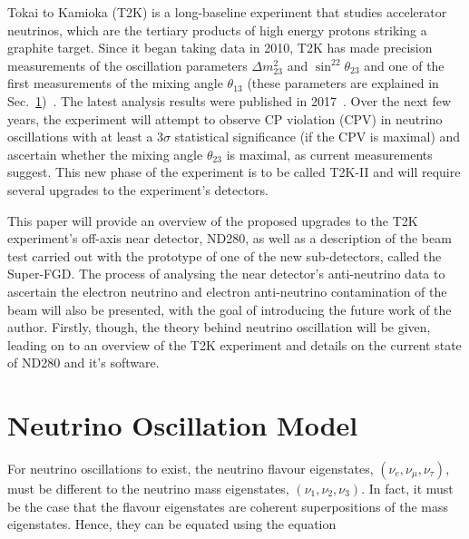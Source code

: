 \documentclass[aps,pra,12pt,notitlepage,tightenlines]{revtex4-1}
\begin{document}
Tokai to Kamioka (T2K) is a long-baseline experiment that studies accelerator neutrinos, which are the tertiary products of high energy protons striking a graphite target. Since it began taking data in 2010, T2K has made precision measurements of the oscillation parameters $\Delta m^2_{23}$ and $\sin^22\theta_{23}$ and one of the first measurements of the mixing angle $\theta_{13}$ (these parameters are explained in Sec.\ \ref{sec:osc})~\cite{PhysRevD.88.032002}. The latest analysis results were published in 2017~\cite{Abe:2017bay}. Over the next few years, the experiment will attempt to observe CP violation (CPV) in neutrino oscillations with at least a 3$\sigma$ statistical significance (if the CPV is maximal) and ascertain whether the mixing angle $\theta_{23}$ is maximal, as current measurements suggest. This new phase of the experiment is to be called T2K-II and will require several upgrades to the experiment's detectors.

This paper will provide an overview of the proposed upgrades to the T2K experiment's off-axis near detector, ND280, as well as a description of the beam test carried out with the prototype of one of the new sub-detectors, called the Super-FGD. The process of analysing the near detector's anti-neutrino data to ascertain the electron neutrino and electron anti-neutrino contamination of the beam will also be presented, with the goal of introducing the future work of the author. Firstly, though, the theory behind neutrino oscillation will be given, leading on to an overview of the T2K experiment and details on the current state of ND280 and it's software.

\section{Neutrino Oscillation Model}
\label{sec:osc}
For neutrino oscillations to exist, the neutrino flavour eigenstates, $(\nu_e, \nu_\mu, \nu_\tau)$, must be different to the neutrino mass eigenstates, $(\nu_1, \nu_2, \nu_3)$. In fact, it must be the case that the flavour eigenstates are coherent superpositions of the mass eigenstates. Hence, they can be equated using the equation
\end{document}
